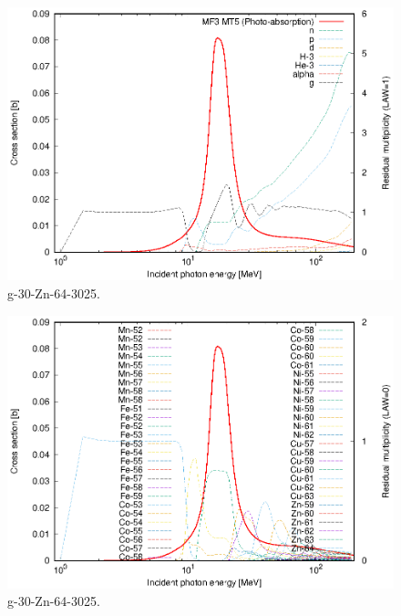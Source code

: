 \begin{figure}
 \includegraphics[width=\linewidth]{eps/g_30-Zn-64_3025.eps}
  \caption{g-30-Zn-64-3025.}
\end{figure}
\begin{figure}
 \includegraphics[width=\linewidth]{eps-law0/g_30-Zn-64_3025.eps}
 \caption{g-30-Zn-64-3025.}
\end{figure}
\newpage \clearpage

